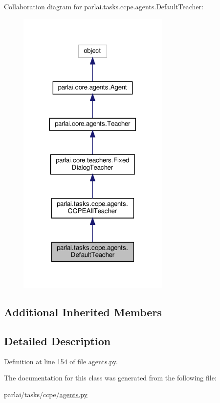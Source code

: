 Collaboration diagram for parlai.\+tasks.\+ccpe.\+agents.\+Default\+Teacher\+:\nopagebreak
\begin{figure}[H]
\begin{center}
\leavevmode
\includegraphics[width=212pt]{da/ddf/classparlai_1_1tasks_1_1ccpe_1_1agents_1_1DefaultTeacher__coll__graph}
\end{center}
\end{figure}
\subsection*{Additional Inherited Members}


\subsection{Detailed Description}


Definition at line 154 of file agents.\+py.



The documentation for this class was generated from the following file\+:\begin{DoxyCompactItemize}
\item 
parlai/tasks/ccpe/\hyperlink{parlai_2tasks_2ccpe_2agents_8py}{agents.\+py}\end{DoxyCompactItemize}
